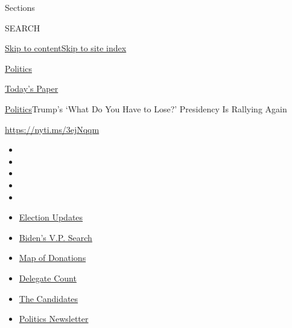 Sections

SEARCH

\protect\hyperlink{site-content}{Skip to
content}\protect\hyperlink{site-index}{Skip to site index}

\href{https://www.nytimes.com/section/politics}{Politics}

\href{https://myaccount.nytimes.com/auth/login?response_type=cookie\&client_id=vi}{}

\href{https://www.nytimes.com/section/todayspaper}{Today's Paper}

\href{/section/politics}{Politics}\textbar{}Trump's `What Do You Have to
Lose?' Presidency Is Rallying Again

\url{https://nyti.ms/3ejNqqm}

\begin{itemize}
\item
\item
\item
\item
\item
\end{itemize}

\begin{itemize}
\item
  \href{https://www.nytimes.com/2020/07/31/us/elections/biden-vs-trump.html?action=click\&pgtype=Article\&state=default\&region=TOP_BANNER\&context=storylines_menu}{Election
  Updates}
\item
  \href{https://www.nytimes.com/article/biden-vice-president-2020.html?action=click\&pgtype=Article\&state=default\&region=TOP_BANNER\&context=storylines_menu}{Biden's
  V.P. Search}
\item
  \href{https://www.nytimes.com/interactive/2020/07/24/us/politics/trump-biden-campaign-donors.html?action=click\&pgtype=Article\&state=default\&region=TOP_BANNER\&context=storylines_menu}{Map
  of Donations}
\item
  \href{https://www.nytimes.com/interactive/2020/us/elections/delegate-count-primary-results.html?action=click\&pgtype=Article\&state=default\&region=TOP_BANNER\&context=storylines_menu}{Delegate
  Count}
\item
  \href{https://www.nytimes.com/interactive/2019/us/politics/2020-presidential-candidates.html?action=click\&pgtype=Article\&state=default\&region=TOP_BANNER\&context=storylines_menu}{The
  Candidates}
\item
  \href{https://www.nytimes.com/newsletters/politics?action=click\&pgtype=Article\&state=default\&region=TOP_BANNER\&context=storylines_menu}{Politics
  Newsletter}
\end{itemize}

